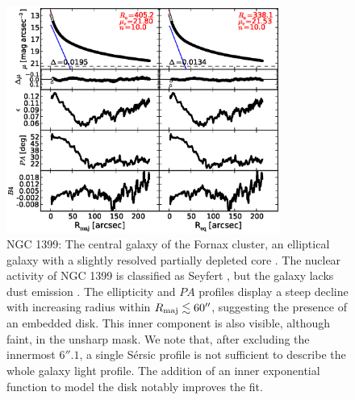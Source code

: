 \documentclass[preprint2]{emulateapj}
\newcommand{\fitfigurewidth}{0.8\textwidth}
\begin{document}
  \begin{figure}[h]
  \begin{center}
  \includegraphics[width=\fitfigurewidth]{n1399_1Dfit.eps}
  \caption{NGC 1399: 
  The central galaxy of the Fornax cluster, an elliptical galaxy with a slightly resolved partially depleted core \citep{rusli2013,dullograham2014cores}. 
  The nuclear activity of NGC 1399 is classified as Seyfert \citep{veroncettyveron2006},
  but the galaxy lacks dust emission \citep{tran2001}.
  The ellipticity and $PA$ profiles display a steep decline with increasing radius within $R_{\rm maj} \lesssim 60''$,
  suggesting the presence of an embedded disk.
  This inner component is also visible, although faint, in the unsharp mask.
  We note that, after excluding the innermost $6''.1$,
  a single S\'ersic profile is not sufficient to describe the whole galaxy light profile.
  The addition of an inner exponential function to model the disk notably improves the fit.
  }
  \end{center}
  \end{figure}
\end{document}
